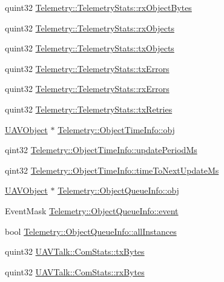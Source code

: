 \begin{DoxyCompactItemize}
quint32 \hyperlink{group___u_a_v_talk_plugin_ga495b5acf35424dbdf221e81f0024ae92}{\-Telemetry\-::\-Telemetry\-Stats\-::rx\-Object\-Bytes}
\item 
quint32 \hyperlink{group___u_a_v_talk_plugin_gacd544f271fc6ee0f5eb72dc101a23c21}{\-Telemetry\-::\-Telemetry\-Stats\-::rx\-Objects}
\item 
quint32 \hyperlink{group___u_a_v_talk_plugin_gaa7970a8185efea335e5cbe734739eca9}{\-Telemetry\-::\-Telemetry\-Stats\-::tx\-Objects}
\item 
quint32 \hyperlink{group___u_a_v_talk_plugin_gad6930d8f0e5a3c2e251c9600d1264c1a}{\-Telemetry\-::\-Telemetry\-Stats\-::tx\-Errors}
\item 
quint32 \hyperlink{group___u_a_v_talk_plugin_gaf07e5e11a7f3b4c277a26fa5dba7d3fa}{\-Telemetry\-::\-Telemetry\-Stats\-::rx\-Errors}
\item 
quint32 \hyperlink{group___u_a_v_talk_plugin_ga071780b1d6a06aa36a41efaa190e97ec}{\-Telemetry\-::\-Telemetry\-Stats\-::tx\-Retries}
\item 
\hyperlink{class_u_a_v_object}{\-U\-A\-V\-Object} $\ast$ \hyperlink{group___u_a_v_talk_plugin_ga5dc98fd0fc9c63da03a2468969adb919}{\-Telemetry\-::\-Object\-Time\-Info\-::obj}
\item 
qint32 \hyperlink{group___u_a_v_talk_plugin_ga63538585df200e147d34a4a929976b4d}{\-Telemetry\-::\-Object\-Time\-Info\-::update\-Period\-Ms}
\item 
qint32 \hyperlink{group___u_a_v_talk_plugin_gad3f8bd7cd7ca82748573626dde1055af}{\-Telemetry\-::\-Object\-Time\-Info\-::time\-To\-Next\-Update\-Ms}
\item 
\hyperlink{class_u_a_v_object}{\-U\-A\-V\-Object} $\ast$ \hyperlink{group___u_a_v_talk_plugin_ga467e2ec75abb2e4535cac1d8cc872692}{\-Telemetry\-::\-Object\-Queue\-Info\-::obj}
\item 
\-Event\-Mask \hyperlink{group___u_a_v_talk_plugin_ga6cc8fb5745c2e3cc2a6e0e4512542d7c}{\-Telemetry\-::\-Object\-Queue\-Info\-::event}
\item 
bool \hyperlink{group___u_a_v_talk_plugin_gaf8816b148dce6b50838c9e84272a1d04}{\-Telemetry\-::\-Object\-Queue\-Info\-::all\-Instances}
\item 
quint32 \hyperlink{group___u_a_v_talk_plugin_ga6ab32543081346e61bdc67874617d3e1}{\-U\-A\-V\-Talk\-::\-Com\-Stats\-::tx\-Bytes}
\item 
quint32 \hyperlink{group___u_a_v_talk_plugin_ga93a6f8b7f60333a7e7afb70085ca7efd}{\-U\-A\-V\-Talk\-::\-Com\-Stats\-::rx\-Bytes}
\item 

\end{DoxyCompactItemize}

